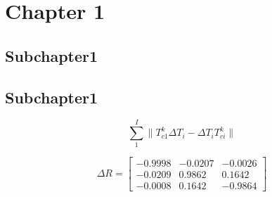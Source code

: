 \section{Chapter 1}
\label{sec:chap1}

\subsection{Subchapter1}
\label{sec:chap1sec1}

\subsection{Subchapter1}
\label{sec:chap1sec1}

\begin{equation}
	\sum_1^I \| T_{c1}^k \Delta T_i - \Delta T_i T_{ci}^k \|
\end{equation}

\begin{equation}
\Delta R = 
	\begin{bmatrix}
	-0.9998 & -0.0207 & -0.0026 \\
	-0.0209 &  0.9862 &  0.1642 \\
	-0.0008 &  0.1642 & -0.9864
	\end{bmatrix}
	\label{eq:matrix}
\end{equation}
